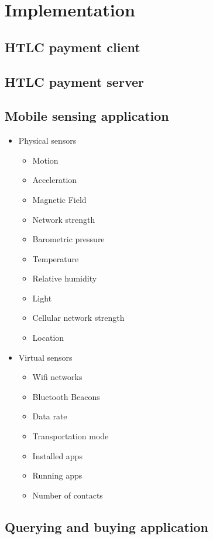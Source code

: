 \documentclass{sig-alternate}
\begin{document}
\section{Implementation}

	\subsection{HTLC payment client}

	\subsection{HTLC payment server}

	\subsection{Mobile sensing application}

	\begin{itemize}
	\item Physical sensors
		\begin{itemize}
		\item Motion
		\item Acceleration
		\item Magnetic Field
		\item Network strength
		\item Barometric pressure
		\item Temperature
		\item Relative humidity
		\item Light
		\item Cellular network strength
		\item Location
		\end{itemize}
	\item Virtual sensors
		\begin{itemize}
		\item Wifi networks
		\item Bluetooth Beacons
		\item Data rate
		\item Transportation mode
		\item Installed apps
		\item Running apps
		\item Number of contacts
		\end{itemize}
	\end{itemize}


	\subsection{Querying and buying application}
\end{document}
